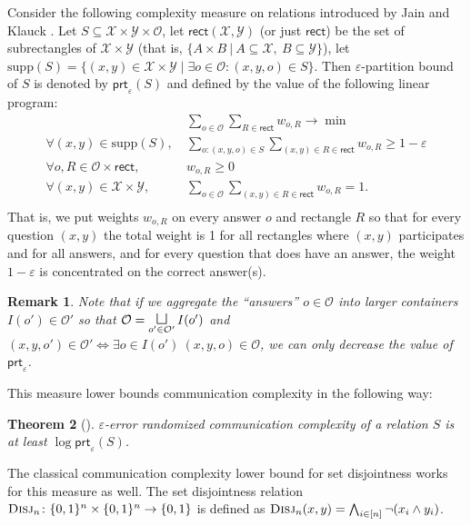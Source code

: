 \documentclass[11pt]{article}
\newcommand{\scterm}[1]{{\textrm{\sc #1}}}
\newcommand{\rect}{\mathsf{rect}}
\newcommand{\recttwo}[2]{\rect(#1,#2)}
\newcommand{\prt}{\mathsf{prt}}
\newcommand{\supp}{\mathrm{supp}}
\newcommand{\disj}{\scterm{Disj}}
\numberwithin{equation}{section}
\newtheorem{theorem}{Theorem}[section]
\newtheorem{remark}[theorem]{Remark}
\begin{document}
Consider the following complexity measure on relations introduced by Jain and Klauck \cite[Definition 22]{JK10}. Let $S \subseteq \mathcal{X} \times \mathcal{Y} \times \mathcal{O}$, let $\recttwo{\mathcal{X}}{\mathcal{Y}}$ (or just $\rect$) be the set of subrectangles of $\mathcal{X} \times \mathcal{Y}$ (that is, $\{A\times B\ |\ A\subseteq \mathcal{X},\ B\subseteq \mathcal{Y}\}$), let $\supp(S) = \{(x,y) \in \mathcal{X} \times \mathcal{Y} \mid \exists o \in \mathcal{O}\colon (x,y,o) \in S\}$. Then $\varepsilon$-partition bound of $S$ is denoted by $\prt_\varepsilon(S)$ and defined by the value of the following linear program:
\begin{align*}
  & ~\sum_{o \in \mathcal{O}} \sum_{R \in \rect} w_{o, R} \to \min \\
   \forall (x,y) \in \supp(S), &~ \sum_{o: (x,y,o) \in S} \sum_{(x,y) \in R \in \rect} w_{o, R} \ge 1-\varepsilon \\
   \forall o, R\in\mathcal{O} \times \rect, &~ w_{o, R} \ge 0 \\
   \forall (x,y) \in \mathcal{X} \times \mathcal{Y}, &~ \sum_{o \in \mathcal{O}} \sum_{(x,y) \in R \in \rect} w_{o, R} = 1. \\
\end{align*}
That is, we put weights $w_{o,R}$ on every answer $o$ and rectangle $R$ so that for every question $(x,y)$ the total weight is 1 for all rectangles where $(x,y)$ participates and for all answers, and for every question that does have an answer, the weight $1-\varepsilon$ is concentrated on the correct answer(s).
\begin{remark}\label{rem:clause-search}
Note that if we aggregate the ``answers'' $o\in\mathcal{O}$ into larger containers
$I(o')\in\mathcal{O'}$ so that $\mathcal{O} = \mathop{{\mbox{\Large$\sqcup$}}}\limits_{o'\in\mathcal{O'}} I(o')$
and $(x,y,o')\in\mathcal{O'}\Leftrightarrow \exists o\in I(o')\ (x,y,o)\in\mathcal{O}$,
we can only decrease the value of $\prt_\varepsilon$.
\end{remark}

This measure lower bounds communication complexity in the following way:
\begin{theorem}[\cite{JK10}]
    $\varepsilon$-error randomized communication complexity of a relation $S$ is at least $\log \prt_\varepsilon (S)$.
\end{theorem}

The classical communication complexity lower bound for set disjointness works for this measure as well. The set disjointness relation $\disj_n\colon \{0,1\}^n \times \{0,1\}^n \to \{0,1\}$ is defined as $\disj_n(x,y) = \bigwedge_{i \in [n]} \lnot (x_i \land y_i)$. 
\end{document}
